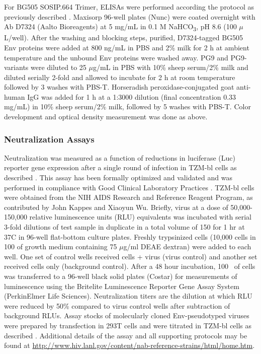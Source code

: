 For BG505 SOSIP.664 Trimer, ELISAs were performed according the protocol as previously described \citep{Sanders:2013gm}. Maxisorp 96-well plates (Nunc) were coated overnight with Ab D7324 (Aalto Bioreagents) at 5 mg/mL in 0.1 M NaHCO\textsubscript{3}, pH 8.6 (100 $\mu$L/well). After the washing and blocking steps, purified, D7324-tagged BG505 Env proteins were added at 800 ng/mL in PBS and 2\% milk for 2 h at ambient temperature and the unbound Env proteins were washed away. PG9 and PG9-variants were diluted to 25 $\mu$g/mL in PBS with 10\% sheep serum/2\% milk and diluted serially 2-fold and allowed to incubate for 2 h at room temperature followed by 3 washes with PBS-T. Horseradish peroxidase-conjugated goat anti-human IgG was added for 1 h at a 1:3000 dilution (final concentration 0.33 mg/mL) in 10\% sheep serum/2\% milk, followed by 5 washes with PBS-T. Color development and optical density measurement was done as above.

\subsubsection{Neutralization Assays}
Neutralization was measured as a function of reductions in luciferase (Luc) reporter gene expression after a single round of infection in TZM-bl cells as described \citep{Montefiori:2009hj,Simek:2009cn}. This assay has been formally optimized and validated and was performed in compliance with Good Clinical Laboratory Practices \citep{SarzottiKelsoe:2013hr}. TZM-bl cells were obtained from the NIH AIDS Research and Reference Reagent Program, as contributed by John Kappes and Xiaoyun Wu.  Briefly, virus at a dose of 50,000-150,000 relative luminescence units (RLU) equivalents was incubated with serial 3-fold dilutions of test sample in duplicate in a total volume of 150 \microliter for 1 hr at 37\degree C in 96-well flat-bottom culture plates.  Freshly trypsinized cells (10,000 cells in 100 \microliter of growth medium containing 75 $\mu$g/ml DEAE dextran) were added to each well.  One set of control wells received cells + virus (virus control) and another set received cells only (background control). After a 48 hour incubation, 100 \microliter~of cells was transferred to a 96-well black solid plates (Costar) for measurements of luminescence using the Britelite Luminescence Reporter Gene Assay System (PerkinElmer Life Sciences). Neutralization titers are the dilution at which RLU were reduced by 50\% compared to virus control wells after subtraction of background RLUs.  Assay stocks of molecularly cloned Env-pseudotyped viruses were prepared by transfection in 293T cells and were titrated in TZM-bl cells as described \citep{Li:2005go}. Additional details of the assay and all supporting protocols may be found at \url{http://www.hiv.lanl.gov/content/nab-reference-strains/html/home.htm}.


